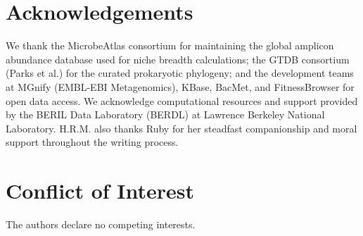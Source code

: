 \documentclass[times]{zHenriquesLab-StyleBioRxiv}
\begin{document}



\section*{Acknowledgements}

We thank the MicrobeAtlas consortium for maintaining the global amplicon abundance
database used for niche breadth calculations; the GTDB consortium (Parks et al.)
for the curated prokaryotic phylogeny; and the development teams at MGnify
(EMBL-EBI Metagenomics), KBase, BacMet, and FitnessBrowser for open data access.
We acknowledge computational resources and support provided by the BERIL Data
Laboratory (BERDL) at Lawrence Berkeley National Laboratory. H.R.M. also thanks
Ruby for her steadfast companionship and moral support throughout the writing process.




\section*{Conflict of Interest}

The authors declare no competing interests.



\end{document}
